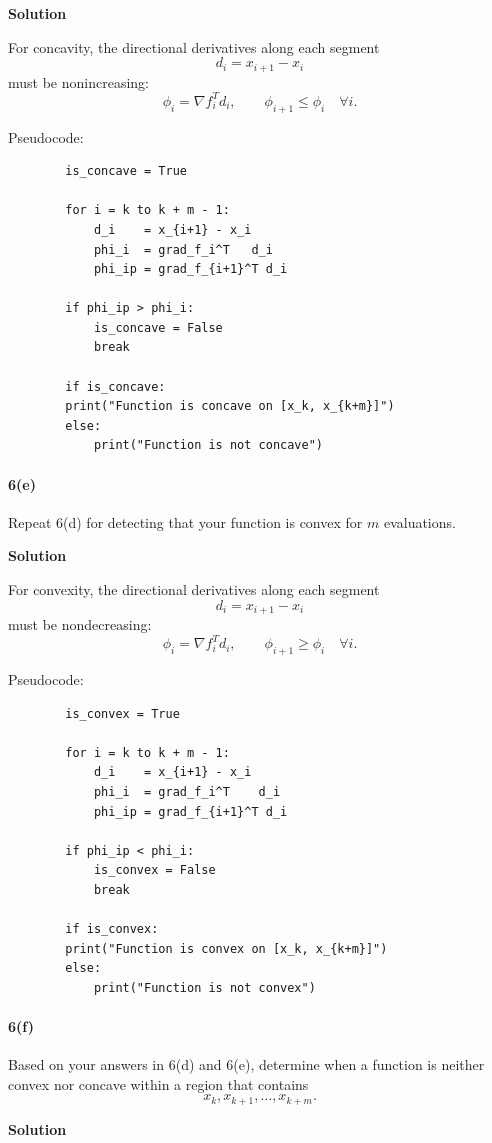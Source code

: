 \documentclass[11pt]{article}
\begin{document}
	\noindent\textbf{Solution}
	
	For concavity, the directional derivatives along each segment
	\[
	d_i = x_{i+1} - x_i
	\]
	must be nonincreasing:
	\[
	\phi_i = \nabla f_i^T d_i, \qquad \phi_{i+1} \le \phi_i \quad \forall i.
	\]
	
	Pseudocode:
	
	\begin{verbatim}
		is_concave = True
		
		for i = k to k + m - 1:
			d_i    = x_{i+1} - x_i
			phi_i  = grad_f_i^T   d_i
			phi_ip = grad_f_{i+1}^T d_i
		
		if phi_ip > phi_i:
			is_concave = False
			break
		
		if is_concave:
		print("Function is concave on [x_k, x_{k+m}]")
		else:
			print("Function is not concave")
	\end{verbatim}
	
	\paragraph{6(e)}  
	Repeat 6(d) for detecting that your function is convex for $m$ evaluations.
	
	\noindent\textbf{Solution}
	
	For convexity, the directional derivatives along each segment
	\[
	d_i = x_{i+1} - x_i
	\]
	must be nondecreasing:
	\[
	\phi_i = \nabla f_i^T d_i, \qquad \phi_{i+1} \ge \phi_i \quad \forall i.
	\]
	
	Pseudocode:
	
	\begin{verbatim}
		is_convex = True
		
		for i = k to k + m - 1:
			d_i    = x_{i+1} - x_i
			phi_i  = grad_f_i^T    d_i
			phi_ip = grad_f_{i+1}^T d_i
		
		if phi_ip < phi_i:
			is_convex = False
			break
		
		if is_convex:
		print("Function is convex on [x_k, x_{k+m}]")
		else:
			print("Function is not convex")
	\end{verbatim}
	
	
	\paragraph{6(f)}  
	Based on your answers in 6(d) and 6(e), determine when a function is neither convex nor concave within a region that contains  
	\[
	x_k, x_{k+1}, \ldots, x_{k+m}.
	\]
	
	\noindent\textbf{Solution}
	
\end{document}
